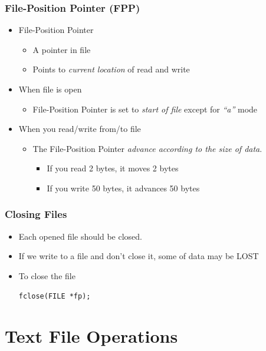 \documentclass{../c-lecture}
\begin{document}
\begin{frame}
  \frametitle{File-Position Pointer (FPP)}
  \begin{itemize}
    \item File-Position Pointer
    \begin{itemize}
      \item A pointer in file
      \item
        Points to \textit{\color{YellowOrange} current location} of read and
        write
    \end{itemize}
    \item When file is open
    \begin{itemize}
      \item
        File-Position Pointer is set to
        \textit{\color{Cyan} start of file} except for
        \textit{\color{LimeGreen}``a''} mode
    \end{itemize}
    \item When you read/write from/to file
    \begin{itemize}
      \item
        The File-Position Pointer
        \textit{\color{Violet} advance according to the size of data}.
      \begin{itemize}
        \item If you read 2 bytes, it moves 2 bytes
        \item If you write 50 bytes, it advances 50 bytes
      \end{itemize}
    \end{itemize}
  \end{itemize}
\end{frame}

\begin{frame}[fragile]
  \frametitle{Closing Files}
  \begin{itemize}
    \item Each opened file should be closed.
    \item If we write to a file and don't close it, some of data may be LOST
    \item To close the file
    \begin{verbatim}
fclose(FILE *fp);
    \end{verbatim}
  \end{itemize}
\end{frame}

\section{Text File Operations}
\end{document}
